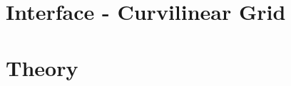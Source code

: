 \documentclass[12pt]{report}
\begin{document}









\chapter{Interface - Curvilinear Grid}





















\chapter{Theory}








\end{document}
